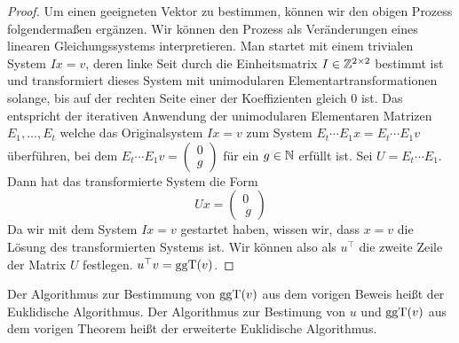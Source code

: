 \begin{proof}
		Um einen geeigneten Vektor zu bestimmen, können wir den obigen Prozess folgendermaßen ergänzen. Wir können den Prozess als Veränderungen eines linearen Gleichungssystems interpretieren. Man startet mit einem trivialen System $I x = v$, deren linke Seit durch die Einheitsmatrix $I \in \mathbb Z^{2 \times 2}$ bestimmt ist und transformiert dieses System mit unimodularen Elementartransformationen solange, bis auf der rechten Seite einer der Koeffizienten gleich $0$ ist. Das entspricht der iterativen Anwendung der unimodularen Elementaren Matrizen $E_1,\ldots,E_t$ welche das Originalsystem $Ix = v$ zum System $E_t \cdots E_1 x = E_t \cdots E_1 v$  überführen, bei dem $E_ t \cdots E_1 v = \begin{pmatrix} 0 \\ g \end{pmatrix}$ für ein $g \in \mathbb N$ erfüllt ist. Sei $U = E_t \cdots E_1$. Dann hat das transformierte System die Form 
		\[
		U x = \begin{pmatrix} 0 \\\ g  \end{pmatrix} 
		\]
		Da wir mit dem System $I x = v$ gestartet haben, wissen wir, dass $x=v$ die Lösung des transformierten Systems ist. Wir können also als $u^\top$ die zweite Zeile der Matrix $U$ festlegen. 
		$u^\top v = \operatorname{ggT}(v)$. 
	\end{proof} 
	
	\begin{bem} 
		Der Algorithmus zur Bestimmung von $\operatorname{ggT}(v)$ aus dem vorigen Beweis heißt der Euklidische Algorithmus. Der Algorithmus zur Bestimung von $u$ und $\operatorname{ggT}(v)$ aus dem vorigen Theorem heißt der erweiterte Euklidische Algorithmus. 
	\end{bem} 
	
	
	
